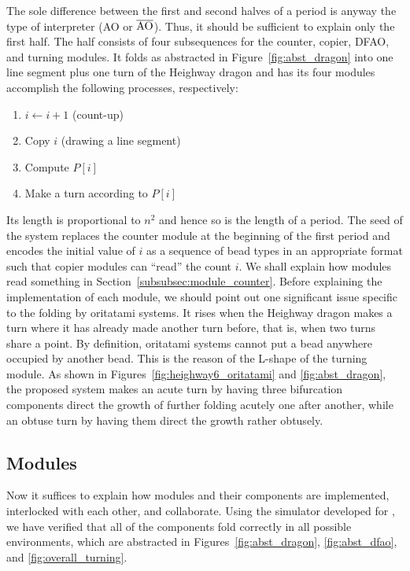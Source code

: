 The sole difference between the first and second halves of a period is anyway the type of interpreter (AO or $\overline{\rm AO}$). 
Thus, it should be sufficient to explain only the first half. 
The half consists of four subsequences for the counter, copier, DFAO, and turning modules. 
It folds as abstracted in Figure~\ref{fig:abst_dragon} into one line segment plus one turn of the Heighway dragon and has its four modules accomplish the following processes, respectively: 
\begin{enumerate}[itemsep=0pt]
\item $i \gets i + 1$ (count-up)
\item Copy $i$ (drawing a line segment)
\item Compute $P[i]$
\item Make a turn according to $P[i]$
\end{enumerate}
Its length is proportional to $n^2$ and hence so is the length of a period. 
The seed of the system replaces the counter module at the beginning of the first period and encodes the initial value of $i$ as a sequence of bead types in an appropriate format such that copier modules can ``read'' the count $i$. 
We shall explain how modules read something in Section~\ref{subsubsec:module_counter}. 
Before explaining the implementation of each module, we should point out one significant issue specific to the folding by oritatami systems. 
It rises when the Heighway dragon makes a turn where it has already made another turn before, that is, when two turns share a point. 
By definition, oritatami systems cannot put a bead anywhere occupied by another bead. 
This is the reason of the L-shape of the turning module. 
As shown in Figures~\ref{fig:heighway6_oritatami} and \ref{fig:abst_dragon}, the proposed system makes an acute turn by having three bifurcation components direct the growth of further folding acutely one after another, while an obtuse turn by having them direct the growth rather obtusely. 

		\subsection{Modules}

Now it suffices to explain how modules and their components are implemented, interlocked with each other, and collaborate. 
Using the simulator developed for \cite{HaKiOtSe2016}, we have verified that all of the components fold correctly in all possible environments, which are abstracted in Figures~\ref{fig:abst_dragon}, \ref{fig:abst_dfao}, and \ref{fig:overall_turning}. 

